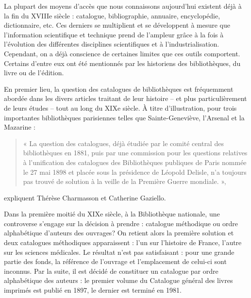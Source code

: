 La plupart des moyens d'accès que nous connaissons aujourd'hui existent déjà  à la fin du XVIIIe siècle : catalogue, bibliographie, annuaire, encyclopédie, dictionnaire, etc. Ces derniers se multiplient et se développent à mesure que l'information scientifique et technique prend de l'ampleur grâce à la fois à l'évolution des différentes disciplines scientifiques et à l'industrialisation. Cependant, on a déjà conscience de certaines limites que ces outils comportent. Certains d'entre eux ont été mentionnés par les historiens des bibliothèques, du livre ou de l'édition. \newline

En premier lieu, la question des catalogues de bibliothèques est fréquemment abordée dans les divers articles traitant de leur histoire – et plus particulièrement de leurs études – tout au long du XIXe siècle. À titre d'illustration, pour trois importantes bibliothèques parisiennes telles que Sainte-Geneviève, l'Arsenal et la Mazarine :
\begin{quote}
    « La question des catalogues, déjà étudiée par le comité central des bibliothèques en 1881, puis par une commission pour les questions relatives à l’unification des catalogues des Bibliothèques publiques de Paris nommée le 27 mai 1898 et placée sous la présidence de Léopold Delisle, n’a toujours pas trouvé de solution à la veille de la Première Guerre mondiale. »,
    \end{quote}expliquent Thérèse Charmasson et  Catherine Gaziello. \newline
    
Dans la première moitié du XIXe siècle, à la Bibliothèque nationale, une controverse s'engage sur la décision à prendre : catalogue méthodique ou ordre alphabétique d'auteurs des ouvrages? On retient alors la première solution et deux catalogues méthodiques apparaissent : l'un sur l'histoire de France, l'autre sur les sciences médicales. Le résultat n'est pas satisfaisant : pour une grande partie des fonds, la référence de l'ouvrage et l'emplacement de celui-ci sont inconnus. Par la suite, il est décidé de constituer un catalogue par ordre alphabétique des auteurs : le premier volume du Catalogue général des livres imprimés est publié en 1897, le dernier est terminé en 1981. \newline

